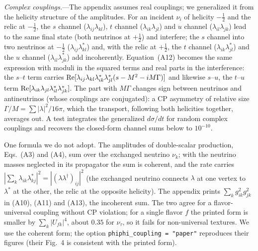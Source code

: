 \documentclass[11pt,a4paper]{article}
\begin{document}
\textit{Complex couplings.}---The appendix assumes real couplings; we generalized it from the
helicity structure of the amplitudes. For an incident $\nu_i$ of helicity $-\tfrac12$ and the relic
at $-\tfrac12$, the $s$ channel ($\lambda_{ij}\lambda_{kl}$), $t$ channel ($\lambda_{ik}\lambda_{jl}$)
and $u$ channel ($\lambda_{il}\lambda_{jk}$) lead to the same final state (both neutrinos at
$+\tfrac12$) and interfere; the $s$ channel into two neutrinos at $-\tfrac12$
($\lambda_{ij}\lambda^*_{kl}$) and, with the relic at $+\tfrac12$, the $t$ channel
($\lambda_{ik}\lambda^*_{jl}$) and the $u$ channel ($\lambda_{il}\lambda^*_{jk}$) add incoherently.
Equation~(A12) becomes the same expression with moduli in the squared terms and real parts in the
interference: the $s$--$t$ term carries ${\rm Re}[\lambda_{ij}\lambda_{kl}\lambda^*_{ik}\lambda^*_{jl}
(s - M^2 - iM\Gamma)]$ and likewise $s$--$u$, the $t$--$u$ term
${\rm Re}[\lambda_{ik}\lambda_{jl}\lambda^*_{il}\lambda^*_{jk}]$. The part with $M\Gamma$ changes
sign between neutrinos and antineutrinos (whose couplings are conjugated): a CP asymmetry of
relative size $\Gamma/M = \sum|\lambda|^2/16\pi$, which the transport, following both helicities
together, averages out. A test integrates the generalized $d\sigma/dt$ for random complex
couplings and recovers the closed-form channel sums below to $10^{-10}$.

One formula we do not adopt. The amplitudes of double-scalar production, Eqs.~(A3) and (A4),
sum over the exchanged neutrino $\nu_k$; with the neutrino masses neglected in its propagator the
sum is coherent, and the rate carries $|\sum_k\lambda_{ik}\lambda^*_{kj}|^2 =
|(\lambda\lambda^\dagger)_{ij}|^2$ (the exchanged neutrino connects $\lambda$ at one vertex to
$\lambda^*$ at the other, the relic at the opposite helicity). The appendix prints
$\sum_k g_{ik}^2 g_{jk}^2$ in (A10), (A11) and (A13), the incoherent sum. The two agree for a
flavor-universal coupling without CP violation; for a single flavor $f$ the printed form is smaller
by $\sum_k|U_{fk}|^4$, about $0.35$ for $\nu_\tau$, so it fails for non-universal textures. We use
the coherent form; the option \texttt{phiphi\_coupling = "paper"} reproduces their figures (their
Fig.~4 is consistent with the printed form).
\end{document}
